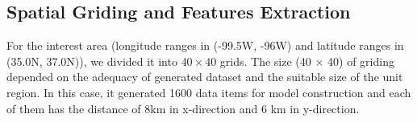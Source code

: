 \documentclass[final-report]{report-template}
\begin{document}
    



\subsection{Spatial Griding and Features Extraction}
For the interest area (longitude ranges in (-99.5W, -96W) and latitude ranges in (35.0N, 37.0N)), we divided it into $40 \times 40$ grids. 
The size (40 $\times$ 40) of griding depended on the adequacy of generated dataset and the suitable size of the unit region.
In this case, it generated 1600 data items for model construction and each of them has the distance of 8km in x-direction and 6 km in y-direction.
\end{document}
